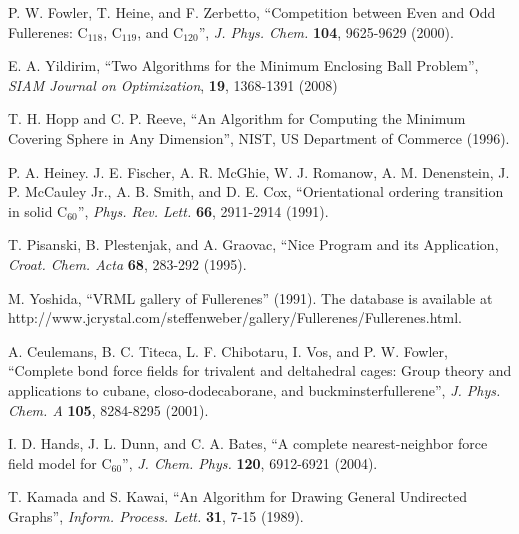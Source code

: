 \documentclass[article,a4paper,twoside]{memoir}
\newcommand{\C}[1]{\ensuremath{\mathrm{C}_{#1}}}
\begin{document}
\begin{thebibliography}{99}
 P. W. Fowler, T. Heine, and F. Zerbetto, ``Competition between Even and Odd Fullerenes:  C$_{118}$, C$_{119}$, and C$_{120}$'', 
\textit{J. Phys. Chem.} \textbf{104}, 9625-9629 (2000).

 E. A. Yildirim, ``Two Algorithms for the Minimum Enclosing Ball Problem'', 
\textit{SIAM Journal on Optimization}, \textbf{19}, 1368-1391 (2008) 

 T. H. Hopp and C. P. Reeve, ``An Algorithm for Computing the Minimum Covering Sphere in Any Dimension'', 
NIST, US Department of Commerce (1996).

 P. A. Heiney. J. E. Fischer, A. R. McGhie, W. J. Romanow, A. M. Denenstein, J. P. McCauley Jr., A. B. Smith, and D. E. Cox,
``Orientational ordering transition in solid \C{60}'', \textit{Phys. Rev. Lett.} \textbf{66}, 2911-2914 (1991).

 T. Pisanski, B. Plestenjak, and A. Graovac, ``Nice Program and its Application, \textit{Croat. Chem. Acta} \textbf{68}, 283-292 (1995).

 M. Yoshida, ``VRML gallery of Fullerenes'' (1991). The database is available at http://www.jcrystal.com/steffenweber/gallery/Fullerenes/Fullerenes.html.

 A. Ceulemans, B. C. Titeca, L. F. Chibotaru, I. Vos, and P. W. Fowler, ``Complete bond force fields for trivalent and deltahedral cages: Group theory and applications to cubane, closo-dodecaborane, and buckminsterfullerene'', \textit{J. Phys. Chem. A} \textbf{105}, 8284-8295 (2001).

 I. D. Hands, J. L. Dunn, and C. A. Bates, ``A complete nearest-neighbor force field model for \C{60}'', 
\textit{J. Chem. Phys.} \textbf{120}, 6912-6921 (2004).

 T. Kamada and S. Kawai, ``An Algorithm for Drawing General Undirected Graphs'', \textit{Inform. Process. Lett.} \textbf{31}, 7-15 (1989).

\end{thebibliography}
\end{document}

